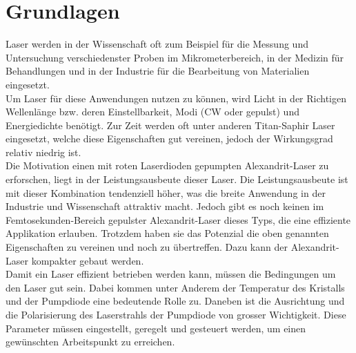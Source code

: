 \documentclass[a4paper,10pt]{scrartcl}
\begin{document}
\section{Grundlagen}
Laser werden in der Wissenschaft oft zum Beispiel für die Messung und Untersuchung verschiedenster Proben im Mikrometerbereich, in der Medizin für Behandlungen und in der Industrie für die Bearbeitung von Materialien eingesetzt.\\
Um Laser für diese Anwendungen nutzen zu können, wird Licht in der Richtigen Wellenlänge bzw. deren Einstellbarkeit, Modi (CW oder gepulst) und Energiedichte benötigt. Zur Zeit werden oft unter anderen Titan-Saphir Laser eingesetzt, welche diese Eigenschaften gut vereinen, jedoch der Wirkungsgrad relativ niedrig ist.\\
Die Motivation einen mit roten Laserdioden gepumpten Alexandrit-Laser zu erforschen, liegt in der Leistungsausbeute dieser Laser. Die Leistungsausbeute ist mit dieser Kombination tendenziell höher, was die breite Anwendung in der Industrie und Wissenschaft attraktiv macht. Jedoch gibt es noch keinen im Femtosekunden-Bereich gepulster Alexandrit-Laser dieses Typs, die eine effiziente Applikation erlauben. Trotzdem haben sie das Potenzial die oben genannten Eigenschaften zu vereinen und noch zu übertreffen. Dazu kann der Alexandrit-Laser kompakter gebaut werden.\\

Damit ein Laser effizient betrieben werden kann, müssen die Bedingungen um den Laser gut sein. Dabei kommen unter Anderem der Temperatur des Kristalls und der Pumpdiode eine bedeutende Rolle zu. Daneben ist die Ausrichtung und die Polarisierung des Laserstrahls der Pumpdiode von grosser Wichtigkeit. Diese Parameter müssen eingestellt, geregelt und gesteuert werden, um einen gewünschten Arbeitspunkt zu erreichen.\\
\end{document}
